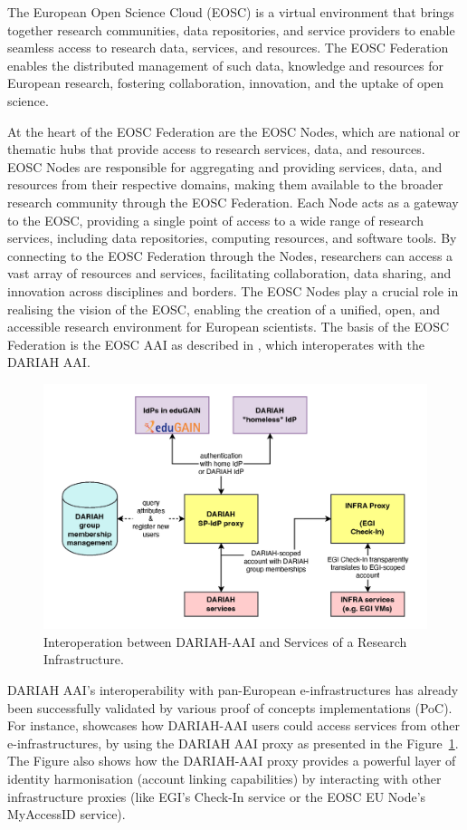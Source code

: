 \documentclass[final]{anthology-ch} %
\begin{document}
The European Open Science Cloud (EOSC) \cite{web_eosc} is a virtual environment that brings together research communities, data repositories, and service providers to enable seamless access to research data, services, and resources. 
The EOSC Federation~\cite{eosc_association_2025_14999577} enables the distributed management of such data, knowledge and resources for European research, fostering collaboration, innovation, and the uptake of open science.

At the heart of the EOSC Federation are the EOSC Nodes, which are national or thematic hubs that provide access to research services, data, and resources. EOSC Nodes are responsible for aggregating and providing services, data, and resources from their respective domains, making them available to the broader research community through the EOSC Federation. Each Node acts as a gateway to the EOSC, providing a single point of access to a wide range of research services, including data repositories, computing resources, and software tools. By connecting to the EOSC Federation through the Nodes, researchers can access a vast array of resources and services, facilitating collaboration, data sharing, and innovation across disciplines and borders. The EOSC Nodes play a crucial role in realising the vision of the EOSC, enabling the creation of a unified, open, and accessible research environment for European scientists. The basis of the EOSC Federation is the EOSC AAI as described in \cite{kanellopoulos_2025_15388270}, which interoperates with the DARIAH AAI.

\begin{figure}[t!]
  \centering
  \includegraphics[width=0.7\linewidth]{figures/Figure_dariahaai2-v2.png}
  \caption{Interoperation between DARIAH-AAI and Services of a Research Infrastructure.}
  \label{fig:dariahaai2}
\end{figure}

DARIAH AAI's interoperability with pan-European e-infrastructures 
has already been successfully validated by various proof of concepts implementations (PoC).
For instance, \cite{dariah_poc} showcases how 
DARIAH-AAI users could access services from other e-infrastructures, by using the DARIAH AAI proxy as presented in the Figure~\ref{fig:dariahaai2}.
The Figure also shows how the DARIAH-AAI proxy provides a powerful layer of identity harmonisation (account linking capabilities) by interacting with other infrastructure proxies (like EGI's Check-In service or the EOSC EU Node's MyAccessID service).
\end{document}
